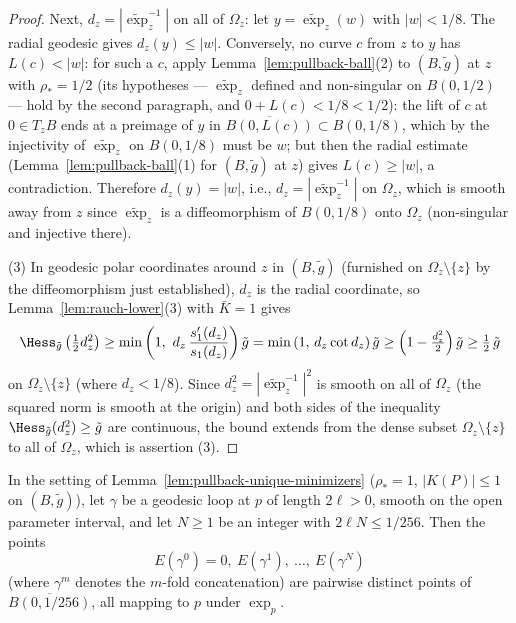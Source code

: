 \begin{proof}
Next, $d_z=|\widetilde\exp_z^{-1}|$ on all of $\Omega_z$: let
$y=\widetilde\exp_z(w)$ with $|w|<1/8$. The radial geodesic gives
$d_z(y)\le|w|$. Conversely, no curve $c$ from $z$ to $y$ has
$L(c)<|w|$: for such a $c$, apply
Lemma~\ref{lem:pullback-ball}(2) to $(B,\tilde g)$ at $z$ with
$\rho_*=1/2$ (its hypotheses --- $\widetilde\exp_z$ defined and
non-singular on $B(0,1/2)$ --- hold by the second paragraph, and
$0+L(c)<1/8<1/2$): the lift of $c$ at $0\in T_zB$ ends at a
preimage of $y$ in $\overline{B(0,L(c))}\subset B(0,1/8)$, which
by the injectivity of $\widetilde\exp_z$ on $B(0,1/8)$ must be
$w$; but then the radial estimate
(Lemma~\ref{lem:pullback-ball}(1) for $(B,\tilde g)$ at $z$)
gives $L(c)\ge|w|$, a contradiction. Therefore $d_z(y)=|w|$,
i.e., $d_z=|\widetilde\exp_z^{-1}|$ on $\Omega_z$, which is
smooth away from $z$ since $\widetilde\exp_z$ is a diffeomorphism
of $B(0,1/8)$ onto $\Omega_z$ (non-singular and injective there).

(3) In geodesic polar coordinates around $z$ in $(B,\tilde g)$
(furnished on $\Omega_z\setminus\{z\}$ by the diffeomorphism just
established), $d_z$ is the radial coordinate, so
Lemma~\ref{lem:rauch-lower}(3) with $\bar K=1$ gives
$$\Hess_{\tilde g}\left(\tfrac12d_z^2\right)
\ge\min\left(1,\ d_z\,\frac{s_1'(d_z)}{s_1(d_z)}\right)\tilde g
=\min\left(1,\,d_z\cot d_z\right)\tilde g
\ge\left(1-\tfrac{d_z^2}{2}\right)\tilde g\ge\tfrac12\,\tilde g$$
on $\Omega_z\setminus\{z\}$ (where $d_z<1/8$). Since
$d_z^2=|\widetilde\exp_z^{-1}|^2$ is smooth on all of $\Omega_z$
(the squared norm is smooth at the origin) and both sides of the
inequality $\Hess_{\tilde g}(d_z^2)\ge\tilde g$ are continuous,
the bound extends from the dense subset
$\Omega_z\setminus\{z\}$ to all of $\Omega_z$, which is assertion
(3).
\end{proof}

\begin{lemma}
\label{lem:loop-multiples-distinct}


In the setting of Lemma~\ref{lem:pullback-unique-minimizers}
($\rho_*=1$, $|K(P)|\le1$ on $(B,\tilde g)$), let $\gamma$ be a
geodesic loop at $p$ of length $2\ell>0$, smooth on the open
parameter interval, and let $N\ge1$ be an integer with
$2\ell N\le1/256$. Then the points
$$E(\gamma^0)=0,\ E(\gamma^1),\ \ldots,\ E(\gamma^N)$$
(where $\gamma^m$ denotes the $m$-fold concatenation) are pairwise
distinct points of $\overline{B(0,1/256)}$, all mapping to $p$
under $\exp_p$.
\end{lemma}

